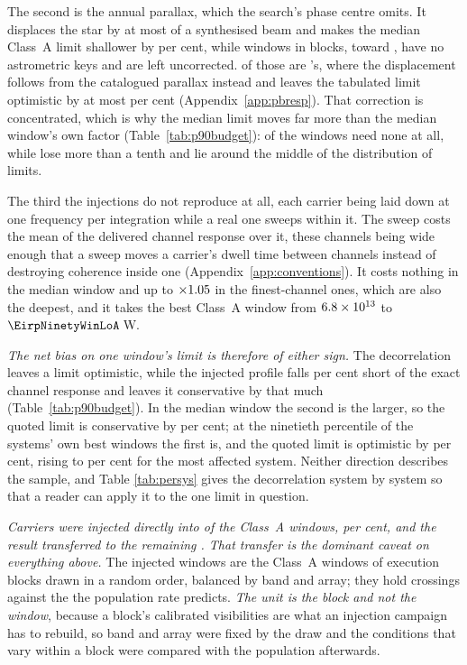 The second is the annual parallax, which the search's phase centre omits. It
displaces the star by at most \SensBeamsMax{} of a synthesised beam and makes
the median Class~A limit shallower by \PxaShiftWinPct{} per cent, while
\PxaNMissing{} windows in \PxaNMissingEb{} blocks, toward
\PxaMissingStars, have no astrometric keys and are left uncorrected.
\PxaNMissingTop{} of those are \PxaMissingTopStar's, where the displacement
follows from the catalogued parallax instead and leaves the tabulated limit
optimistic by at most \BmEpsPxBoundPct{} per cent
(Appendix~\ref{app:pbresp}). That correction is concentrated, which is
why the median limit moves far more than the median window's own factor
(Table~\ref{tab:p90budget}): \RpPxNNone{} of the \NWinA{} windows need none
at all, while \RpPxNBig{} lose more than a tenth and lie around the middle of
the distribution of limits.

The third the injections do not reproduce at all, each carrier being laid
down at one frequency per integration while a real one sweeps within it. The
sweep costs the mean of the delivered channel response over it, these
channels being wide enough that a sweep moves a carrier's dwell time between
channels instead of destroying coherence inside one
(Appendix~\ref{app:conventions}). It costs nothing in the median
window and up to $\times1.05$ in the \SmcNAbove{} finest-channel
ones, which are also the deepest, and it takes the best Class~A window from
$6.8\times10^{13}$ to $\EirpNinetyWinLoA$\,W.

\emph{The net bias on one window's limit is therefore of either sign.} The
decorrelation leaves a limit optimistic, while the injected profile falls
\InjShortPct{} per cent short of the exact channel response and leaves it
conservative by that much (Table~\ref{tab:p90budget}). In the median window
the second is the larger, so the quoted limit is conservative by
\NmNetConsPct{} per cent; at the ninetieth percentile of the systems' own
best windows the first is, and the quoted limit is optimistic by
\NmNetOptPct{} per cent, rising to \NmNetOptMaxPct{} per cent for the most
affected system. Neither direction describes the sample, and Table
\ref{tab:persys} gives the decorrelation system by system so that a reader
can apply it to the one limit in question.

\emph{Carriers were injected directly into \SensNInj{} of the \NWinA{}
Class~A windows, \SensNInjPct{} per cent, and the result transferred to the
remaining \SensNTransfer. That transfer is the dominant caveat on everything
above.} The injected windows are the Class~A windows of execution blocks
drawn in a random order, balanced by band and array; they hold
\SensNCrossAch{} crossings against the \SensNCrossExp{} the population rate
predicts. \emph{The unit is the block and not the window}, because a block's
calibrated visibilities are what an injection campaign has to rebuild, so
band and array were fixed by the draw and the conditions that vary within a
block were compared with the population afterwards.

